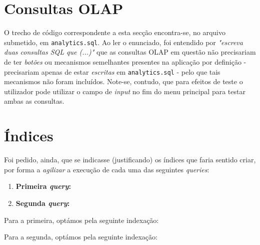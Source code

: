 \documentclass[12pt,a4paper]{article}
\begin{document}

  \section*{Consultas OLAP}

  O trecho de código correspondente a esta secção encontra-se, no arquivo submetido,
  em \texttt{analytics.sql}. Ao ler o enunciado, foi entendido por \textit{"escreva
  duas consultas SQL que (...)"} que as consultas OLAP em questão não precisariam
  de ter \textit{botões} ou mecanismos semelhantes presentes na aplicação por
  definição - precisariam apenas de estar \textit{escritas} em \texttt{analytics.sql} -
  pelo que tais mecanismos não foram incluídos. Note-se, contudo, que para efeitos de teste
  o utilizador pode utilizar o campo de \textit{input} no fim do menu principal
  para testar ambas as consultas.

  \section*{Índices}

  Foi pedido, ainda, que se indicasse (justificando) os índices que faria sentido
  criar, por forma a \textit{agilizar} a execução de cada uma das seguintes \textit{queries}:

  \begin{enumerate}
    \item \textbf{Primeira \textit{query}:}
    
    

    \item \textbf{Segunda \textit{query}:}
  
    
  \end{enumerate}
  
  Para a primeira, optámos pela seguinte indexação:


  Para a segunda, optámos pela seguinte indexação:

\end{document}
